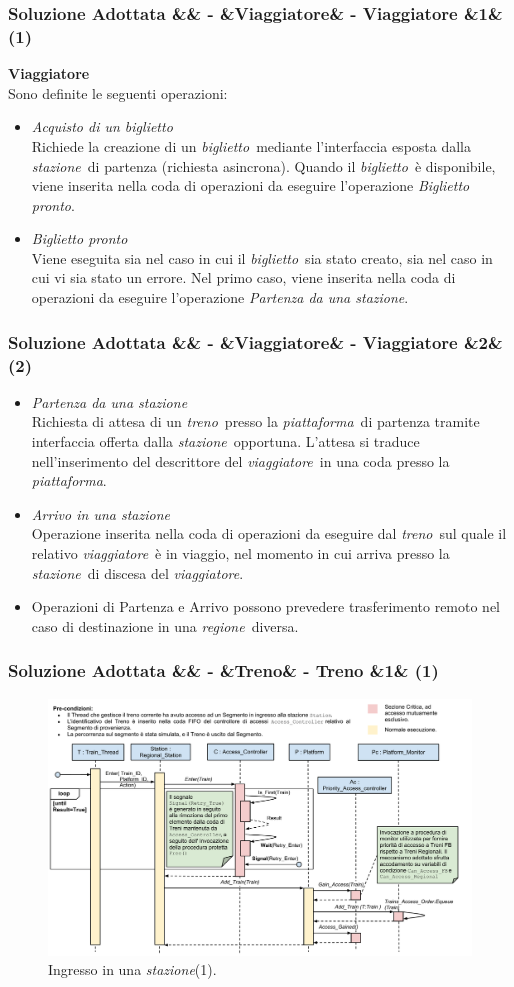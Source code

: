 \documentclass[slidestop,compress,blackandwhite]{beamer}
\newcommand{\ii}[1]{\textit{#1}}
\newcommand{\treno}{\ii{treno}}
\newcommand{\viaggiatore}{\ii{viaggiatore}}
\newcommand{\stazione}{\ii{stazione}}
\newcommand{\piattaforma}{\ii{piattaforma}}
\newcommand{\ticket}{\ii{biglietto}}
\newcommand{\regione}{\ii{regione}}
\newcommand{\newtitle}[4]{
	#1 
	\ifx&#2&%
	\else
  		\large- #2
	\fi
	\ifx&#3&%
	\else
  		\normalsize- #3
	\fi
	\ifx&#4&%
	\else
  		\normalsize (#4)
	\fi
}
\newcommand{\newframe}[5]{
	\begin{frame}
		\frametitle{\newtitle{#1}{#2}{#3}{#4}}
		#5
	\end{frame}
}
\newcommand{\myitemize}[1]{\begin{itemize}#1\end{itemize}}
\begin{document}
	\newframe{Soluzione Adottata}{}{Viaggiatore}{1}{
		\textbf{Viaggiatore}\\
		\vspace{0.5cm}
		Sono definite le seguenti operazioni:
		\myitemize{
			\item \ii{Acquisto di un biglietto}\\
			Richiede la creazione di un \ticket~mediante l'interfaccia esposta dalla \stazione~di partenza (richiesta asincrona). Quando il \ticket~è disponibile, viene inserita nella coda di operazioni da eseguire l'operazione \ii{Biglietto pronto}.
			
			\item \ii{Biglietto pronto}\\
			Viene eseguita sia nel caso in cui il \ticket~sia stato creato, sia nel caso in cui vi sia stato un errore. Nel primo caso, viene inserita nella coda di operazioni da eseguire l'operazione \ii{Partenza da una stazione}. 
			
		}
	}

	\newframe{Soluzione Adottata}{}{Viaggiatore}{2}{
	
		\myitemize{
			\item \ii{Partenza da una stazione}\\
			Richiesta di attesa di un \treno~presso la \piattaforma~di partenza tramite interfaccia offerta dalla \stazione~opportuna. L'attesa si traduce nell'inserimento del descrittore del \viaggiatore~in una coda presso la \piattaforma.
			
			\item \ii{Arrivo in una stazione}\\ 
			Operazione inserita nella coda di operazioni da eseguire dal \treno~sul quale il relativo \viaggiatore~è in viaggio, nel momento in cui arriva presso la \stazione~di discesa del \viaggiatore.
			\item Operazioni di Partenza e Arrivo possono prevedere trasferimento remoto nel caso di destinazione in una \regione~diversa.
		}
	}

	\newframe{Soluzione Adottata}{}{Treno}{1}{
	
		\begin{figure}
			\includegraphics[scale=0.27,trim=0mm 20mm 0mm 20mm]{imgs/platform_access_1}
			\caption{\scriptsize Ingresso in una \stazione (1).}
		\end{figure}
		
	}
\end{document}
